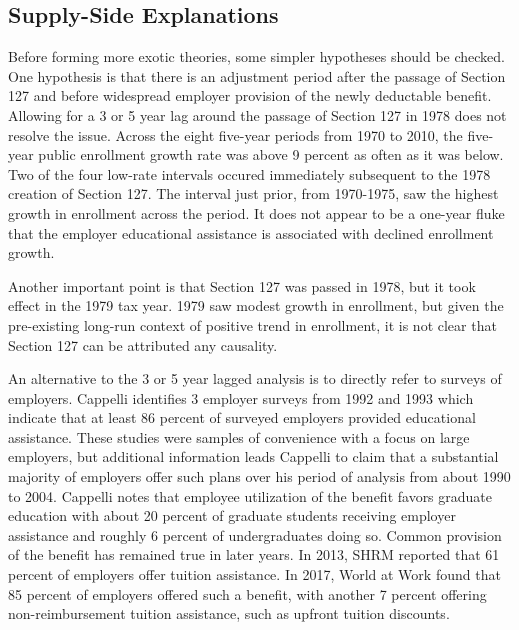 \documentclass[review]{elsarticle}
\begin{document}
    \subsection{Supply-Side Explanations}
    Before forming more exotic theories, some simpler hypotheses should be checked.
    One hypothesis is that there is an adjustment period after the passage of Section 127 and before widespread employer provision of the newly deductable benefit.
    Allowing for a 3 or 5 year lag around the passage of Section 127 in 1978 does not resolve the issue.
    Across the eight five-year periods from 1970 to 2010, the five-year public enrollment growth rate was above 9 percent as often as it was below.
    Two of the four low-rate intervals occured immediately subsequent to the 1978 creation of Section 127.
    The interval just prior, from 1970-1975, saw the highest growth in enrollment across the period.
    It does not appear to be a one-year fluke that the employer educational assistance is associated with declined enrollment growth.
    
    Another important point is that Section 127 was passed in 1978, but it took effect in the 1979 tax year.
    1979 saw modest growth in enrollment,
    but given the pre-existing long-run context of positive trend in enrollment,
    it is not clear that Section 127 can be attributed any causality.

    An alternative to the 3 or 5 year lagged analysis is to directly refer to surveys of employers.
    Cappelli\cite{cappelli2004employers} identifies 3 employer surveys from 1992 and 1993 which indicate that at least 86 percent of surveyed employers provided educational assistance.
    These studies were samples of convenience with a focus on large employers,
    but additional information leads Cappelli to claim that a substantial majority of employers offer such plans over his period of analysis from about 1990 to 2004.
    Cappelli notes that employee utilization of the benefit favors graduate education
    with about 20 percent of graduate students receiving employer assistance
    and roughly 6 percent of undergraduates doing so.
    Common provision of the benefit has remained true in later years.
    In 2013, SHRM reported that 61 percent of employers offer tuition assistance\cite{cherry2014rejuvenating}.
    In 2017, World at Work found that 85 percent of employers offered such a benefit,
    with another 7 percent offering non-reimbursement tuition assistance, such as upfront tuition discounts\cite{talentculture_2018}.
\end{document}
